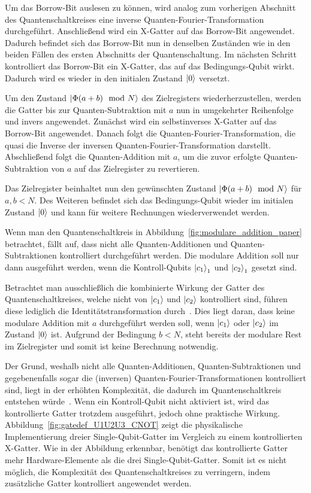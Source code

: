 Um das Borrow-Bit auslesen zu können, 
wird analog zum vorherigen Abschnitt des Quantenschaltkreises eine inverse Quanten-Fourier-Transformation durchgeführt.
Anschließend wird ein X-Gatter auf das Borrow-Bit angewendet.
Dadurch befindet sich das Borrow-Bit nun in denselben Zuständen wie in den beiden Fällen des ersten Abschnitts der Quantenschaltung.
Im nächsten Schritt kontrolliert das Borrow-Bit ein X-Gatter, das auf das Bedingungs-Qubit wirkt.
Dadurch wird es wieder in den initialen Zustand \(\ket{0}\) versetzt.

Um den Zustand \(\ket{\Phi(a+b)\mod N}\) des Zielregisters wiederherzustellen, 
werden die Gatter bis zur Quanten-Subtraktion mit \(a\)
nun in umgekehrter Reihenfolge und invers angewendet.
Zunächst wird ein selbstinverses X-Gatter auf das Borrow-Bit angewendet.
Danach folgt die Quanten-Fourier-Transformation, 
die quasi die Inverse der inversen Quanten-Fourier-Transformation darstellt.
Abschließend folgt die Quanten-Addition mit \(a\), 
um die zuvor erfolgte Quanten-Subtraktion von \(a\) auf das Zielregister zu revertieren.

Das Zielregister beinhaltet nun den gewünschten Zustand \(\ket{\Phi(a+b)\mod N}\) für \(a, b < N\).
Des Weiteren befindet sich das Bedingungs-Qubit wieder im initialen Zustand \(\ket{0}\) und kann für weitere Rechnungen wiederverwendet werden.

\vspace{1em}

Wenn man den Quantenschaltkreis in Abbildung~\ref{fig:modulare_addition_paper} betrachtet,
fällt auf, 
dass nicht alle Quanten-Additionen und Quanten-Subtraktionen kontrolliert durchgeführt werden.
Die modulare Addition soll nur dann ausgeführt werden, 
wenn die Kontroll-Qubits \(\ket{c_1}_1\) und \(\ket{c_2}_1\) gesetzt sind.

Betrachtet man ausschließlich die kombinierte Wirkung der Gatter des Quantenschaltkreises, 
welche nicht von \(\ket{c_1}\) und \(\ket{c_2}\) kontrolliert sind, 
führen diese lediglich die Identitätstransformation durch~\cite{beauregard2003circuit}.
Dies liegt daran, dass keine modulare Addition mit \(a\) durchgeführt werden soll, 
wenn \(\ket{c_1}\) oder \(\ket{c_2}\) im Zustand \(\ket{0}\) ist. 
Aufgrund der Bedingung \(b < N\), 
steht bereits der modulare Rest im Zielregister und somit ist keine Berechnung notwendig.

Der Grund, weshalb nicht alle Quanten-Additionen, 
Quanten-Subtraktionen und gegebenenfalls sogar die (inversen) Quanten-Fourier-Transformationen kontrolliert sind,
liegt in der erhöhten Komplexität, die dadurch im Quantenschaltkreis entstehen würde~\cite{beauregard2003circuit}.
Wenn ein Kontroll-Qubit nicht aktiviert ist, wird das kontrollierte Gatter trotzdem ausgeführt, jedoch ohne praktische Wirkung.
Abbildung~\ref{fig:gatedef_U1U2U3_CNOT} zeigt die physikalische Implementierung dreier Single-Qubit-Gatter im Vergleich zu einem kontrollierten X-Gatter.
Wie in der Abbildung erkennbar, 
benötigt das kontrollierte Gatter mehr Hardware-Elemente als die drei Single-Qubit-Gatter.
Somit ist es nicht möglich, 
die Komplexität des Quantenschaltkreises zu verringern, 
indem zusätzliche Gatter kontrolliert angewendet werden.

